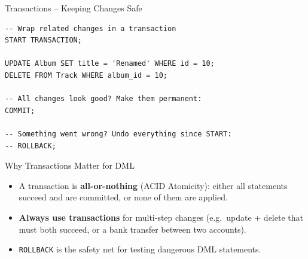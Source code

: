 \begin{frame}[fragile]{Transactions -- Keeping Changes Safe}
  \begin{lstlisting}[style=sqlstyle]
-- Wrap related changes in a transaction
START TRANSACTION;

UPDATE Album SET title = 'Renamed' WHERE id = 10;
DELETE FROM Track WHERE album_id = 10;

-- All changes look good? Make them permanent:
COMMIT;

-- Something went wrong? Undo everything since START:
-- ROLLBACK;
  \end{lstlisting}

  \begin{block}{Why Transactions Matter for DML}
    \begin{itemize}
      \item A transaction is \textbf{all-or-nothing} (ACID Atomicity): either all statements succeed
            and are committed, or none of them are applied.
      \item \textbf{Always use transactions} for multi-step changes (e.g.\ update + delete that
            must both succeed, or a bank transfer between two accounts).
      \item \texttt{ROLLBACK} is the safety net for testing dangerous DML statements.
    \end{itemize}
  \end{block}
\end{frame}
